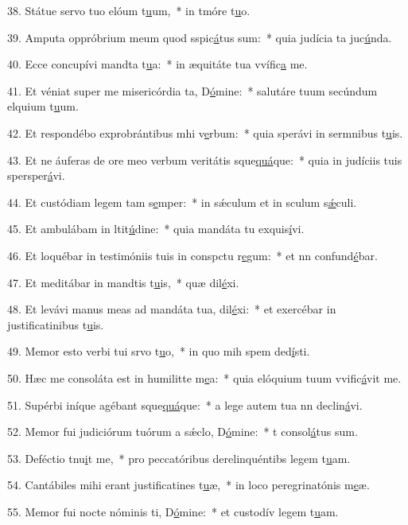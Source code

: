 38. Státue servo tuo elóum t\uline{u}um,~* in tmóre t\uline{u}o.\par 
39. Amputa oppróbrium meum quod sspic\uline{á}tus sum:~* quia judícia ta juc\uline{ú}nda.\par 
40. Ecce concupívi mandta t\uline{u}a:~* in æquitáte tua vvífic\uline{a} me.\par 
41. Et véniat super me misericórdia ta, D\uline{ó}mine:~* salutáre tuum secúndum elquium t\uline{u}um.\par 
42. Et respondébo exprobrántibus mhi v\uline{e}rbum:~* quia sperávi in sermnibus t\uline{u}is.\par 
43. Et ne áuferas de ore meo verbum veritátis sque\uline{quá}que:~* quia in judíciis tuis spersper\uline{á}vi.\par 
44. Et custódiam legem tam s\uline{e}mper:~* in sǽculum et in sculum s\uline{ǽ}culi.\par 
45. Et ambulábam in ltit\uline{ú}dine:~* quia mandáta tu exquis\uline{í}vi.\par 
46. Et loquébar in testimóniis tuis in conspctu r\uline{e}gum:~* et nn confund\uline{é}bar.\par 
47. Et meditábar in mandtis t\uline{u}is,~* quæ dil\uline{é}xi.\par 
48. Et levávi manus meas ad mandáta tua,  dil\uline{é}xi:~* et exercébar in justificatinibus t\uline{u}is.\par 
49. Memor esto verbi tui srvo t\uline{u}o,~* in quo mih spem ded\uline{í}sti.\par 
50. Hæc me consoláta est in humilitte m\uline{e}a:~* quia elóquium tuum vvific\uline{á}vit me.\par 
51. Supérbi iníque agébant sque\uline{quá}que:~* a lege autem tua nn declin\uline{á}vi.\par 
52. Memor fui judiciórum tuórum a sǽclo, D\uline{ó}mine:~* t consol\uline{á}tus sum.\par 
53. Deféctio tnu\uline{i}t me,~* pro peccatóribus derelinquéntibs legem t\uline{u}am.\par 
54. Cantábiles mihi erant justificatines t\uline{u}æ,~* in loco peregrinatónis m\uline{e}æ.\par 
55. Memor fui nocte nóminis ti, D\uline{ó}mine:~* et custodív legem t\uline{u}am.\par 
